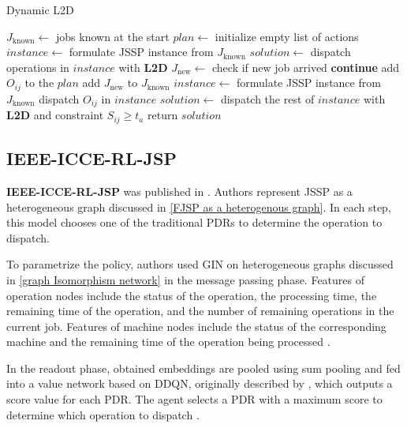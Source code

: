 \begin{algorithm}[H]
	\caption{Dynamic L2D}\label{algorithm:dqn}
	\begin{algorithmic}
	\State $J_\text{known} \gets$ jobs known at the start
    \State $plan \gets$ initialize empty list of actions 
    \State $instance \gets$ formulate JSSP instance from $J_\text{known}$
    \State $solution \gets$ dispatch operations in $instance$ with \textbf{L2D} 
        \State $J_\text{new} \gets$ check if new job arrived
            \State \textbf{continue}
        \EndIf
                \State add $O_{ij}$ to the $plan$
            \EndIf
		\EndFor
        \State add $J_\text{new}$ to $J_\text{known}$
        \State $instance \gets$ formulate JSSP instance from $J_\text{known}$
            \State dispatch $O_{ij}$ in $instance$
        \EndFor
        \State $solution \gets$ dispatch the rest of $instance$ with \textbf{L2D} and constraint $S_{ij} \geq t_a$ 
	\EndWhile
    \State return $solution$
\end{algorithmic}
\end{algorithm}

\subsection{IEEE-ICCE-RL-JSP}

\textbf{IEEE-ICCE-RL-JSP} was published in \cite{10226873}. Authors represent JSSP as a heterogeneous graph discussed in \ref{FJSP as a heterogenous graph}. In each step, this model chooses one of the traditional PDRs to determine the operation to dispatch.
\par
To parametrize the policy, authors used GIN on heterogeneous graphs discussed in \ref{graph Isomorphism network} in the message passing phase. Features of operation nodes include the status of the operation, the processing time, the remaining time of the operation, and the number of remaining operations in the current job. Features of machine nodes include the status of the corresponding machine and the remaining time of the operation being processed \cite{10226873}.
\par
In the readout phase, obtained embeddings are pooled using sum pooling and fed into a value network based on DDQN, originally described by \cite{DBLP:journals/corr/HasseltGS15}, which outputs a score value for each PDR. The agent selects a PDR with a maximum score to determine which operation to dispatch \cite{10226873}.

